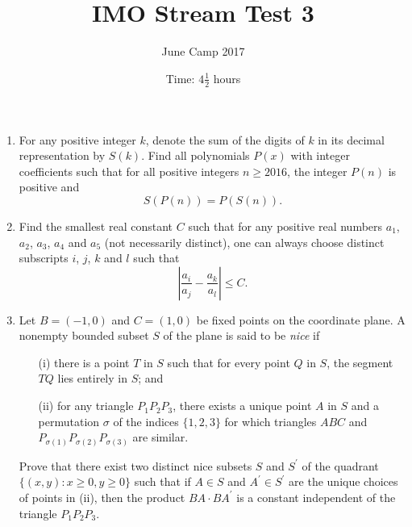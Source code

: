 \documentclass{article}
\title{IMO Stream Test 3}
\author{June Camp 2017}
\date{Time: $4\frac{1}{2}$ hours}
\begin{document}
 \maketitle

\begin{enumerate}

\item %
	For any positive integer $k$, denote the sum of the digits of $k$ in its decimal representation by $S(k)$. Find all polynomials $P(x)$ with integer coefficients such that for all positive integers $n \geq 2016$, the integer $P(n)$ is positive and \[S(P(n)) = P(S(n)).\]

\item %
	Find the smallest real constant $C$ such that for any positive real numbers $a_1$, $a_2$, $a_3$, $a_4$ and $a_5$ (not necessarily distinct), one can always choose distinct subscripts $i$, $j$, $k$ and $l$ such that \[\left| \frac{a_i}{a_j}-\frac{a_k}{a_l} \right| \leq C.\]

\item %
	Let $B = (-1,0)$ and $C = (1,0)$ be fixed points on the coordinate plane. A nonempty bounded subset $S$ of the plane is said to be \emph{nice} if
	\begin{itemize}
		\item[(i)] there is a point $T$ in $S$ such that for every point $Q$ in $S$, the segment $TQ$ lies entirely in $S$; and
		\item[(ii)] for any triangle $P_1P_2P_3$, there exists a unique point $A$ in $S$ and a permutation $\sigma$ of the indices $\{1,2,3\}$ for which triangles $ABC$ and $P_{\sigma(1)}P_{\sigma(2)}P_{\sigma(3)}$ are similar.
	\end{itemize}
	
	Prove that there exist two distinct nice subsets $S$ and $S^\prime$ of the quadrant $\{(x,y) : x \geq 0, y \geq 0\}$ such that if $A \in S$ and $A^\prime \in S^\prime$ are the unique choices of points in (ii), then the product $BA\cdot BA^\prime$ is a constant independent of the triangle $P_1P_2P_3$.

\end{enumerate}
\end{document}
